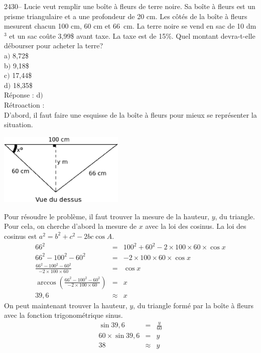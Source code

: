 \documentclass[letterpaper, 12pt]{article}
\begin{document}
2430--  Lucie veut remplir une bo\^ite \`a fleurs de terre noire. Sa bo\^ite \`a fleurs est un prisme triangulaire et a une profondeur de 20 cm. Les c\^ot\'es de la bo\^ite \`a fleurs mesurent chacun 100 cm, 60 cm et \mbox{66 cm}. La terre noire se vend en sac de 10 dm$^{3}$ et un sac co\^ute 3,99\$ avant taxe. La taxe est de 15\%. Quel montant devra-t-elle d\'ebourser pour acheter la terre? \\

a$)$ 8,72\$\\
b$)$ 9,18\$\\
c$)$ 17,44\$\\
d$)$ 18,35\$\\


R\'eponse : d$)$\\

R\'etroaction :\\
D'abord, il faut faire une esquisse de la bo\^ite \`a fleurs pour mieux se repr\'esenter la situation.
\begin{center}
 \includegraphics[width=6cm,bb=14 14 828 488]{Q2420.eps}
\end{center}
Pour r\'esoudre le probl\`eme, il faut trouver la mesure de la hauteur, $y$, du triangle. Pour cela, on cherche d'abord la mesure de $x$ avec la loi des cosinus. La loi des cosinus est $a^{2}=b^{2}+c^{2}-2bc\cos{A}$.
\begin{eqnarray*}
 66^{2} &=& 100^{2}+60^{2}-2\times100\times60\times \cos{x}\\
 66^{2}- 100^{2}-60^{2} &=& -2\times100\times60\times \cos{x}\\[2mm]
\frac{ 66^{2}- 100^{2}-60^{2}}{-2\times100\times60} &=& \cos{x}\\[2mm]
\arccos{\left( \frac{ 66^{2}- 100^{2}-60^{2}}{-2\times100\times60}\right) } &=& x\\[2mm]
39,6&\approx& x
\end{eqnarray*}
On peut maintenant trouver la hauteur, $y$, du triangle form\'e par la bo\^ite \`a fleurs avec la fonction trigonom\'etrique sinus.
\begin{eqnarray*}
 \sin{39,6}&=& \frac{y}{60}\\[2mm]
60 \times \sin{39,6} &=& y \\[2mm]
 38 &\approx& y
\end{eqnarray*}
\end{document}
